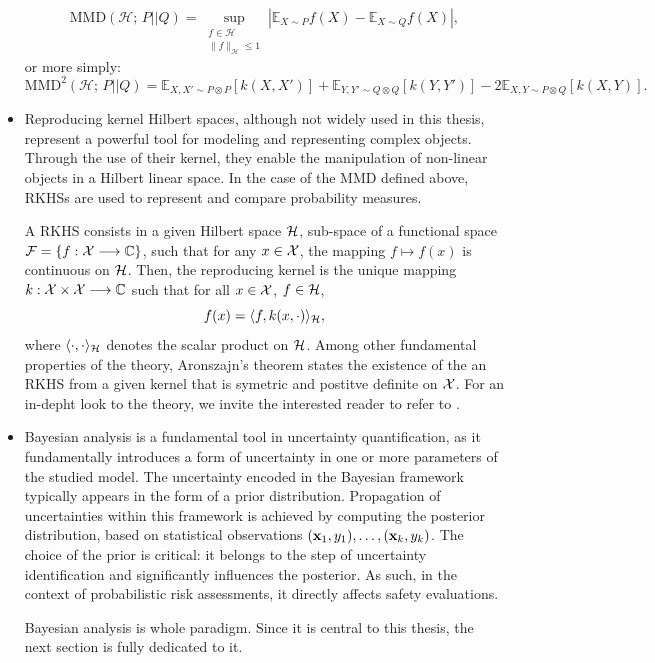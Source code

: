 \begin{itemize}
        \begin{equation}
            \text{MMD}(\mathcal{H};\, P||Q) = \sup_{\substack{f \in \mathcal{H}\\ \|f\|_{\mathcal{H}} \leq 1}} |\mathbb{E}_{X \sim P}f(X) - \mathbb{E}_{X \sim Q}f(X)|,
        \end{equation}
      or more simply:
      \begin{equation}
        \text{MMD}^2(\mathcal{H};\, P||Q) = \mathbb{E}_{X, X' \sim P \otimes P}[k(X, X')] + \mathbb{E}_{Y, Y' \sim Q \otimes Q}[k(Y, Y')] - 2 \mathbb{E}_{X,Y \sim P\otimes Q}[k(X, Y)].
      \end{equation}

    \item Reproducing kernel Hilbert spaces, although not widely used in this thesis, represent a powerful tool for modeling and representing complex objects. Through the use of their 
    kernel, they enable the manipulation of non-linear objects in a Hilbert linear space. In the case of the
    MMD defined above, RKHSs are used to represent and compare probability measures.

    A RKHS consists in a given Hilbert space $\mathcal{H}$, sub-space of a functional space $\mathcal{F}=\{f:\mathcal{X}\longrightarrow\mathbb{C}\}$, such that for any $x\in\mathcal{X}$, the mapping $f\mapsto f(x)$ is continuous on $\mathcal{H}$. Then, the reproducing kernel is the unique mapping $k:\mathcal{X}\times\mathcal{X}\longrightarrow\mathbb{C}$ such that for all $x\in\mathcal{X}$, $f\in\mathcal{H}$,
      \begin{equation}
        f(x) = \langle f,k(x,\cdot) \rangle_{\mathcal{H}},
      \end{equation}
    where $\langle\cdot,\cdot\rangle_{\mathcal{H}}$ denotes the scalar product on $\mathcal{H}$. Among other fundamental properties of the theory, Aronszajn's theorem \citep{aronszajn_theory_1950} states the existence of the an RKHS from a given kernel that is symetric and postitve definite on $\mathcal{X}$. For an in-depht look to the theory, we invite the interested reader to refer to \cite{scholkopf_learning_2001}.

    \item  Bayesian analysis is a fundamental tool in uncertainty quantification, 
    as it fundamentally introduces a form of uncertainty
    in one or more parameters of the studied model. The uncertainty encoded in the Bayesian framework typically appears in the form of a prior distribution. Propagation of uncertainties within this framework is achieved by computing the posterior distribution, based on statistical observations $(\mathbf{x}_1, y_1), \ldots, (\mathbf{x}_k, y_k)$.
      The choice of the prior is critical: it belongs to the step of uncertainty identification and significantly influences the posterior. As such, in the context of probabilistic risk assessments, it directly affects safety evaluations.

      Bayesian analysis is whole paradigm. Since it is central to this thesis, the next section is fully dedicated to it.
\end{itemize}









